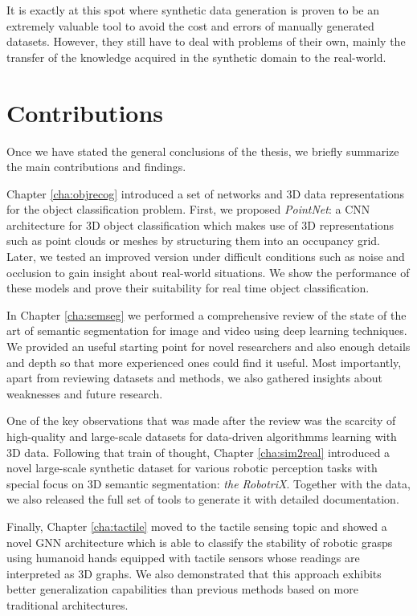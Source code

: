 It is exactly at this spot where synthetic data generation is proven to be an extremely valuable tool to avoid the cost and errors of manually generated datasets. However, they still have to deal with problems of their own, mainly the transfer of the knowledge acquired in the synthetic domain to the real-world.

\section{Contributions}
\label{cha:conclusion:sec:contributions}

Once we have stated the general conclusions of the thesis, we briefly summarize the main contributions and findings.

Chapter \ref{cha:objrecog} introduced a set of networks and \acs{3D} data representations for the object classification problem. First, we proposed \emph{PointNet}: a \acl{CNN} architecture for \acs{3D} object classification which makes use of \acs{3D} representations such as point clouds or meshes by structuring them into an occupancy grid. Later, we tested an improved version under difficult conditions such as noise and occlusion to gain insight about real-world situations. We show the performance of these models and prove their suitability for real time object classification.

In Chapter \ref{cha:semseg} we performed a comprehensive review of the state of the art of semantic segmentation for image and video using deep learning techniques. We provided an useful starting point for novel researchers and also enough details and depth so that more experienced ones could find it useful. Most importantly, apart from reviewing datasets and methods, we also gathered insights about weaknesses and future research.

One of the key observations that was made after the review was the scarcity of high-quality and large-scale datasets for data-driven algorithmms learning with \ac{3D} data. Following that train of thought, Chapter \ref{cha:sim2real} introduced a novel large-scale synthetic dataset for various robotic perception tasks with special focus on 3D semantic segmentation: \emph{the RobotriX}. Together with the data, we also released the full set of tools to generate it with detailed documentation.

Finally, Chapter \ref{cha:tactile} moved to the tactile sensing topic and showed a novel \acl{GNN} architecture which is able to classify the stability of robotic grasps using humanoid hands equipped with tactile sensors whose readings are interpreted as \acs{3D} graphs. We also demonstrated that this approach exhibits better generalization capabilities than previous methods based on more traditional architectures.

